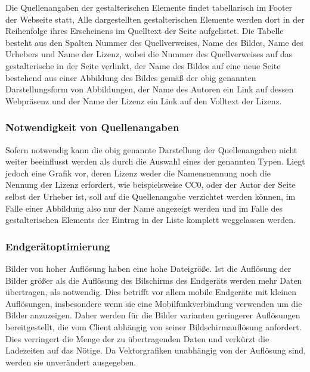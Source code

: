Die Quellenangaben der gestalterischen Elemente findet tabellarisch im Footer der
Webseite statt, Alle dargestellten gestalterischen Elemente werden dort in der
Reihenfolge ihres Erscheinens im Quelltext der Seite aufgelistet. Die Tabelle
besteht aus den Spalten Nummer des Quellverweises, Name des Bildes,
Name des Urhebers und Name der Lizenz, wobei die Nummer des Quellverweises auf
das gestalterische in der Seite verlinkt, der Name des Bildes auf eine neue
Seite bestehend aus einer Abbildung des Bildes gemäß der obig genannten
Darstellungsform von Abbildungen, der Name des Autoren ein Link auf dessen
Webpräsenz und der Name der Lizenz ein Link auf den Volltext der Lizenz.

\subsubsection{Notwendigkeit von Quellenangaben}

Sofern notwendig kann die obig genannte Darstellung der Quellenangaben nicht
weiter beeinflusst werden als durch die Auswahl eines der genannten Typen. Liegt
jedoch eine Grafik vor, deren Lizenz weder die Namensnennung noch die Nennung
der Lizenz erfordert, wie beispielsweise CC0, oder der Autor der Seite selbst der
Urheber ist, soll auf die Quellenangabe verzichtet werden können, im Falle
einer Abbildung also nur der Name angezeigt werden und im Falle des
gestalterischen Elements der Eintrag in der Liste komplett weggelassen werden.


\subsubsection{Endgerätoptimierung}

Bilder von hoher Auflösung haben eine hohe Dateigröße. Ist die Auflösung der
Bilder größer als die Auflösung des Bilschirms des Endgeräts werden mehr Daten
übertragen, als notwendig. Dies betrifft vor allem mobile Endgeräte mit
kleinen Auflösungen, insbesondere wenn sie eine Mobilfunkverbindung verwenden um
die Bilder anzuzeigen. Daher werden für die Bilder varianten geringerer
Auflösungen bereitgestellt, die vom Client abhängig von seiner
Bildschirmauflösung anfordert. Dies verringert die Menge der zu übertragenden
Daten und verkürzt die Ladezeiten auf das Nötige. Da Vektorgrafiken unabhängig
von der Auflösung sind, werden sie unverändert ausgegeben.

